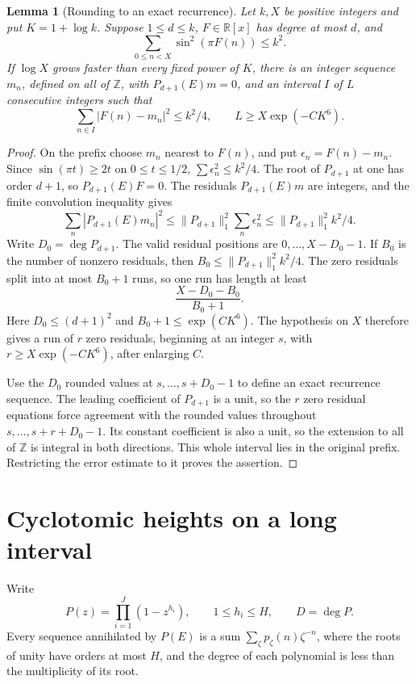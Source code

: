 \documentclass[11pt]{amsart}
\numberwithin{equation}{section}
\newtheorem{lemma}[theorem]{Lemma}
\theoremstyle{remark}
\newcommand{\Z}{\mathbb Z}
\newcommand{\R}{\mathbb R}
\newcommand{\normone}[1]{\lVert #1\rVert_1}
\begin{document}
\begin{lemma}[Rounding to an exact recurrence]\label{lem:rounding}
Let \(k,X\) be positive integers and put \(K=1+\log k\).
Suppose \(1\le d\le k\), \(F\in\R[x]\) has degree at most \(d\), and
\[
 \sum_{0\le n<X}\sin^2(\pi F(n))\le k^2.
\]
If \(\log X\) grows faster than every fixed power of \(K\), there is an
integer sequence \(m_n\), defined on all of \(\Z\), with
\(P_{d+1}(E)m=0\), and an interval \(I\) of \(L\) consecutive integers
such that
\begin{equation}\label{eq:roundenergy}
 \sum_{n\in I}|F(n)-m_n|^2\le k^2/4,\qquad
 L\ge X\exp(-CK^6).
\end{equation}
\end{lemma}
\begin{proof}
On the prefix choose \(m_n\) nearest to \(F(n)\), and put
\(\epsilon_n=F(n)-m_n\).
Since \(\sin(\pi t)\ge2t\) on \(0\le t\le1/2\),
\(\sum\epsilon_n^2\le k^2/4\).
The root of \(P_{d+1}\) at one has order \(d+1\), so
\(P_{d+1}(E)F=0\).
The residuals \(P_{d+1}(E)m\) are integers, and the finite convolution
inequality gives
\[
 \sum_n|P_{d+1}(E)m_n|^2
 \le\normone{P_{d+1}}^2\sum_n\epsilon_n^2
 \le\normone{P_{d+1}}^2 k^2/4.
\]
Write \(D_0=\deg P_{d+1}\). The valid residual positions are
\(0,\ldots,X-D_0-1\). If \(B_0\) is the number of nonzero residuals,
then \(B_0\le \normone{P_{d+1}}^2k^2/4\).
The zero residuals split into at most \(B_0+1\) runs, so one run has
length at least
\[
 \frac{X-D_0-B_0}{B_0+1}.
\]
Here \(D_0\le(d+1)^2\) and \(B_0+1\le\exp(CK^6)\).
The hypothesis on \(X\) therefore gives a run of \(r\) zero residuals,
beginning at an integer \(s\), with \(r\ge X\exp(-CK^6)\), after
enlarging \(C\).

Use the \(D_0\) rounded values at \(s,\ldots,s+D_0-1\) to define an
exact recurrence sequence. The leading coefficient of \(P_{d+1}\)
is a unit, so the \(r\) zero residual equations force agreement with
the rounded values throughout \(s,\ldots,s+r+D_0-1\).
Its constant coefficient is also a unit, so the extension to all of
\(\Z\) is integral in both directions.
This whole interval lies in the original prefix. Restricting the
error estimate to it proves the assertion.
\end{proof}

\section{Cyclotomic heights on a long interval}\label{sec:heights}
Write
\[
 P(z)=\prod_{i=1}^J(1-z^{h_i}),\qquad
 1\le h_i\le H,\qquad D=\deg P.
\]
Every sequence annihilated by \(P(E)\) is a sum
\(\sum_\zeta p_\zeta(n)\zeta^{-n}\), where the roots of unity have
orders at most \(H\), and the degree of each polynomial is less than
the multiplicity of its root.
\end{document}
